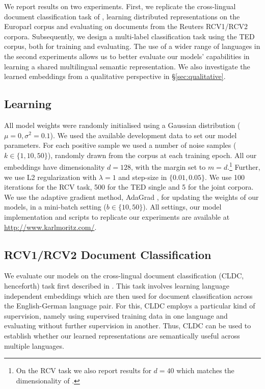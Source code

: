 \documentclass[11pt]{article}
\begin{document}
We report results on two experiments. First, we replicate the cross-lingual
document classification task of , learning distributed
representations on the Europarl corpus and evaluating on documents from the
Reuters RCV1/RCV2 corpora.  Subsequently, we design a multi-label classification
task using the TED corpus, both for training and evaluating.  The use of a wider
range of languages in the second experiments allows
us to better evaluate our models' capabilities in
learning a shared multilingual semantic representation.  We also investigate the
learned embeddings from a qualitative perspective in \S\ref{sec:qualitative}.

\subsection{Learning}

All model weights were randomly initialised using a Gaussian distribution
($\mu{=}0,\sigma^2{=}0.1$). We used the available development data to set our
model parameters. For each positive sample we used a number of noise samples ($k
  \in \{1,10,50\}$), randomly drawn from the corpus at each training epoch.  All
our embeddings have dimensionality $d{=}128$, with the margin set to
$m{=}d$.\footnote{On the RCV task we also report results for $d{=}40$ which
  matches the dimensionality of .} Further, we use L2
regularization with $\lambda{=}1$ and step-size in $\{0.01, 0.05\}$. We use 100
iterations for the RCV task, 500 for the TED single and 5 for the joint
corpora. We use the adaptive gradient method, AdaGrad \cite{Duchi:2011}, for
updating the weights of our models, in a mini-batch setting ($b \in \{10,50\}$).
All settings, our model implementation and scripts to replicate our
experiments are available at \mbox{\url{http://www.karlmoritz.com/}}.

\subsection{RCV1/RCV2 Document Classification}\label{sec:rcv-cldc}

We evaluate our models on the cross-lingual document classification (CLDC,
  henceforth) task first described in .  This task
involves learning language independent embeddings which are then used for
document classification across the English-German language pair.  For this, CLDC
employs a particular kind of supervision, namely using supervised training data
in one language and evaluating without further supervision in another.  Thus,
CLDC can be used to establish whether our learned representations are
semantically useful across multiple languages.
\end{document}
